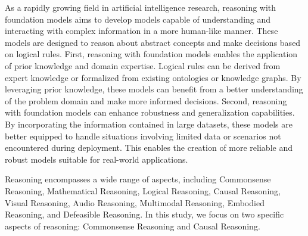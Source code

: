 As a rapidly growing field in artificial intelligence research, reasoning with 
foundation models aims to develop models capable of understanding and interacting 
with complex information in a more human-like manner. These models are designed to 
reason about abstract concepts and make decisions based on logical rules. First, 
reasoning with foundation models enables the application of prior knowledge and 
domain expertise. Logical rules can be derived from expert knowledge or formalized 
from existing ontologies or knowledge graphs. By leveraging prior knowledge, these 
models can benefit from a better understanding of the problem domain and make more 
informed decisions. Second, reasoning with foundation models can enhance robustness 
and generalization capabilities. By incorporating the information contained in large 
datasets, these models are better equipped to handle situations involving limited data 
or scenarios not encountered during deployment. This enables the creation of more 
reliable and robust models suitable for real-world applications.

Reasoning encompasses a wide range of aspects, including Commonsense Reasoning, 
Mathematical Reasoning, Logical Reasoning, Causal Reasoning, Visual Reasoning, 
Audio Reasoning, Multimodal Reasoning, Embodied Reasoning, and Defeasible Reasoning. 
In this study, we focus on two specific aspects of reasoning: Commonsense Reasoning 
and Causal Reasoning.














